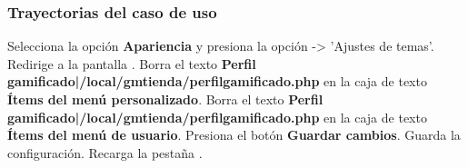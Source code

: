 \subsubsection{Trayectorias del caso de uso}

\begin{UCtrayectoria}%
%
    \Actor Selecciona la opción \textbf{Apariencia}  y presiona la opción -> 'Ajustes de temas'.
    \Sistema Redirige a la pantalla .
    \Actor Borra el texto \textbf{Perfil gamificado|/local/gmtienda/perfilgamificado.php} en la caja de texto \textbf{Ítems del menú personalizado}.
    \Actor Borra el texto \textbf{Perfil gamificado|/local/gmtienda/perfilgamificado.php} en la caja de texto \textbf{Ítems del menú de usuario}.
    \Actor Presiona el botón \textbf{Guardar cambios}.
    \Sistema Guarda la configuración.
    \Sistema Recarga la pestaña  .

\end{UCtrayectoria}
